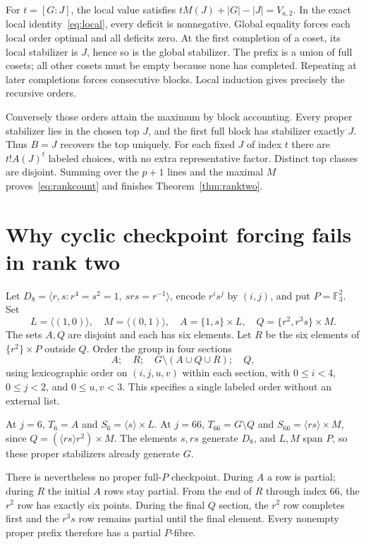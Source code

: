 \documentclass[11pt,letterpaper]{article}
\theoremstyle{definition}\newtheorem{definition}{Definition}
\begin{document}
For $t=[G:J]$, the local value satisfies $tM(J)+|G|-|J|=V_{a,2}$. In the exact local identity~\eqref{eq:local}, every deficit is nonnegative. Global equality forces each local order optimal and all deficits zero. At the first completion of a coset, its local stabilizer is $J$, hence so is the global stabilizer. The prefix is a union of full cosets; all other cosets must be empty because none has completed. Repeating at later completions forces consecutive blocks. Local induction gives precisely the recursive orders.

Conversely those orders attain the maximum by block accounting. Every proper stabilizer lies in the chosen top $J$, and the first full block has stabilizer exactly $J$. Thus $B=J$ recovers the top uniquely. For each fixed $J$ of index $t$ there are $t!A(J)^t$ labeled choices, with no extra representative factor. Distinct top classes are disjoint. Summing over the $p+1$ lines and the maximal $M$ proves~\eqref{eq:rankcount} and finishes Theorem~\ref{thm:ranktwo}.

\section{Why cyclic checkpoint forcing fails in rank two}\label{sec:switch}
Let $D_8=\langle r,s:r^4=s^2=1,\ srs=r^{-1}\rangle$, encode $r^is^j$ by $(i,j)$, and put $P=\mathbb F_3^2$. Set
\[
L=\langle(1,0)\rangle,\quad M=\langle(0,1)\rangle,\quad
A=\{1,s\}\times L,\quad Q=\{r^2,r^3s\}\times M.
\]
The sets $A,Q$ are disjoint and each has six elements. Let $R$ be the six elements of $\{r^2\}\times P$ outside $Q$. Order the group in four sections
\[
A;\quad R;\quad G\setminus(A\cup Q\cup R);\quad Q,
\]
using lexicographic order on $(i,j,u,v)$ within each section, with $0\le i<4$, $0\le j<2$, and $0\le u,v<3$. This specifies a single labeled order without an external list.

At $j=6$, $T_6=A$ and $S_6=\langle s\rangle\times L$. At $j=66$, $T_{66}=G\setminus Q$ and $S_{66}=\langle rs\rangle\times M$, since $Q=(\langle rs\rangle r^2)\times M$. The elements $s,rs$ generate $D_8$, and $L,M$ span $P$, so these proper stabilizers already generate $G$.

There is nevertheless no proper full-$P$ checkpoint. During $A$ a row is partial; during $R$ the initial $A$ rows stay partial. From the end of $R$ through index $66$, the $r^2$ row has exactly six points. During the final $Q$ section, the $r^2$ row completes first and the $r^3s$ row remains partial until the final element. Every nonempty proper prefix therefore has a partial $P$-fibre.
\end{document}
